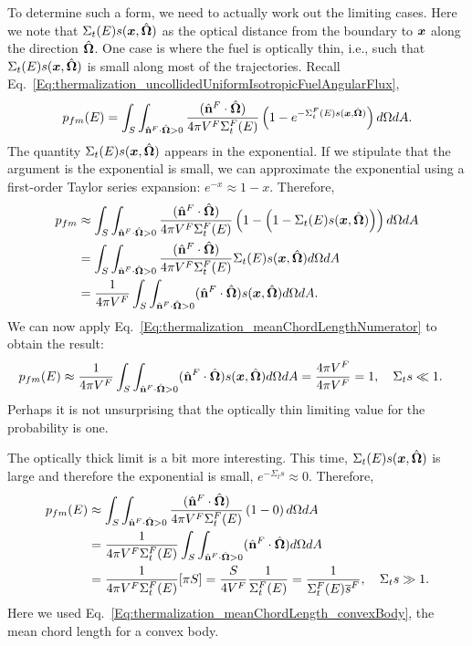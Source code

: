 To determine such a form, we need to actually work out the limiting cases. Here we note that $\Sigma_t(E) s(\bm{x},\hat{\mathbf{\Omega}})$ as the optical distance from the boundary to $\bm{x}$ along the direction $\hat{\mathbf{\Omega}}$. One case is where the fuel is optically thin, i.e., such that $\Sigma_t(E) s(\bm{x},\hat{\mathbf{\Omega}})$ is small along most of the trajectories. Recall Eq.~\eqref{Eq:thermalization_uncollidedUniformIsotropicFuelAngularFlux}, 
\begin{align}
  p_{fm}(E) = \int_{S} \int_{\hat{\mathbf{n}}^F \cdot \hat{\mathbf{\Omega}} > 0}  \frac{( \hat{\mathbf{n}}^F \cdot \hat{\mathbf{\Omega}} )}{4\pi V^F \Sigma_t^F(E)} \left( 1 - e^{-\Sigma_t^F(E) s(\bm{x},\hat{\mathbf{\Omega}})} \right) d\Omega dA. \nonumber
\end{align}
The quantity $\Sigma_t(E) s(\bm{x},\hat{\mathbf{\Omega}})$ appears in the exponential. If we stipulate that the argument is the exponential is small, we can approximate the exponential using a first-order Taylor series expansion: $e^{-x} \approx 1 - x$. Therefore,
\begin{align}
  p_{fm} 
  &\approx \int_{S} \int_{\hat{\mathbf{n}}^F \cdot \hat{\mathbf{\Omega}} > 0} \frac{( \hat{\mathbf{n}}^F \cdot \hat{\mathbf{\Omega}} )}{4\pi V^F \Sigma_t^F(E)} \left( 1 - \left( 1 - \Sigma_t(E) s(\bm{x},\hat{\mathbf{\Omega}}) \right) \right) d\Omega dA \nonumber \\
  &= \int_{S} \int_{\hat{\mathbf{n}}^F \cdot \hat{\mathbf{\Omega}} > 0}  \frac{( \hat{\mathbf{n}}^F \cdot \hat{\mathbf{\Omega}} )}{4\pi V^F \Sigma_t^F(E)} \Sigma_t(E) s(\bm{x},\hat{\mathbf{\Omega}})  d\Omega dA \nonumber \\
  &= \frac{1}{ 4\pi V^F } \int_{S} \int_{\hat{\mathbf{n}}^F \cdot \hat{\mathbf{\Omega}} > 0}  ( \hat{\mathbf{n}}^F \cdot \hat{\mathbf{\Omega}} ) s(\bm{x},\hat{\mathbf{\Omega}})  d\Omega dA . \nonumber 
\end{align}
We can now apply Eq.~\eqref{Eq:thermalization_meanChordLengthNumerator} to obtain the result:
\begin{align}
  p_{fm}(E) 
  &\approx  \frac{1}{ 4\pi V^F } \int_{S} \int_{\hat{\mathbf{n}}^F \cdot \hat{\mathbf{\Omega}} > 0}  ( \hat{\mathbf{n}}^F \cdot \hat{\mathbf{\Omega}} ) s(\bm{x},\hat{\mathbf{\Omega}})  d\Omega dA = \frac{ 4\pi V^F }{ 4\pi V^F } = 1, \quad \Sigma_t s \ll 1.
\end{align}
Perhaps it is not unsurprising that the optically thin limiting value for the probability is one.

The optically thick limit is a bit more interesting. This time, $\Sigma_t(E) s(\bm{x},\hat{\mathbf{\Omega}})$ is large and therefore the exponential is small, $e^{-\Sigma_t s} \approx 0$. Therefore,
\begin{align}
  p_{fm}(E) 
  &\approx \int_{S} \int_{\hat{\mathbf{n}}^F \cdot \hat{\mathbf{\Omega}} > 0} \frac{( \hat{\mathbf{n}}^F \cdot \hat{\mathbf{\Omega}} )}{4\pi V^F \Sigma_t^F(E)} \left( 1 - 0 \right) d\Omega dA \nonumber \\
  &= \frac{1}{ 4\pi V^F \Sigma_t^F(E) } \int_{S} \int_{\hat{\mathbf{n}}^F \cdot \hat{\mathbf{\Omega}} > 0} ( \hat{\mathbf{n}}^F \cdot \hat{\mathbf{\Omega}} ) d\Omega dA \nonumber \\
  &= \frac{1}{ 4\pi V^F \Sigma_t^F(E) } [ \pi S ] = \frac{S}{4V^F} \frac{1}{\Sigma_t^F(E)} = \frac{1}{\Sigma_t^F(E) \overline{s}^F} , \quad \Sigma_t s \gg 1 .
\end{align}
Here we used Eq.~\eqref{Eq:thermalization_meanChordLength_convexBody}, the mean chord length for a convex body.

